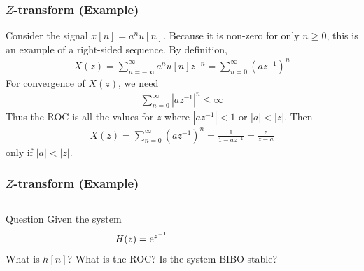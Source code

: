 \documentclass[mathserif,9pt,handout]{beamer}
\begin{document}
\begin{frame}\frametitle{$Z$-transform (Example)}\small
  Consider the signal $x[n] = a^n u[n]$. Because it is non-zero for only $n \geq 0$, this is an example of a right-sided sequence. By definition, 
  \begin{align}
    X(z) = \sum_{n=-\infty}^{\infty} a^n u[n] z^{-n} = \sum_{n=0}^{\infty} (az^{-1})^n \nonumber
  \end{align}
  For convergence of $X(z)$, we need
  \begin{align}
     \sum_{n=0}^{\infty} |az^{-1}|^n  \leq \infty\nonumber
  \end{align}
  Thus the ROC is all the values for $z$ where $|az^{-1}| < 1$ or $|a| < |z|$.  Then 
  \begin{align}
    X(z)  = \sum_{n=0}^{\infty} (az^{-1})^n  = \frac{1}{1 - az^{-1}} = \frac{z}{z-a} \nonumber
  \end{align}
  only if $|a| < |z|$.
\end{frame}



\begin{frame}\frametitle{$Z$-transform (Example)}\small

  \begin{columns}
      \begin{block}{Question}
      Given the system
      \begin{align}
        H(z) = {\textrm{e}}^{z^{-1}} \nonumber
      \end{align}
      What is $h[n]$? What is the ROC? Is the system BIBO stable?
      \end{block}
     \footnotesize
        
  \end{columns}
\end{frame}
\end{document}
